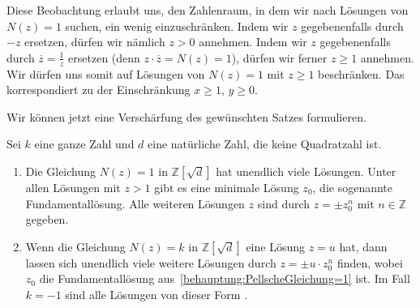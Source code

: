 Diese Beobachtung erlaubt uns, den Zahlenraum, in dem wir nach Lösungen von $N(z)=1$ suchen, ein wenig einzuschränken. Indem wir $z$ gegebenenfalls durch $-z$ ersetzen, dürfen wir nämlich $z>0$ annehmen. Indem wir $z$ gegebenenfalls durch $\overline{z}=\frac 1z$ ersetzen (denn $z\cdot \overline{z}=N(z)=1$), dürfen wir ferner $z\geqslant 1$ annehmen. Wir dürfen uns somit auf Lösungen von $N(z)=1$ mit $z\geqslant 1$ beschränken. Das korrespondiert zu der Einschränkung $x\geqslant 1$, $y\geqslant 0$.

Wir können jetzt eine Verschärfung des gewünschten Satzes formulieren.
\begin{satzmitnamen}
	Sei $k$ eine ganze Zahl und $d$ eine natürliche Zahl, die keine Quadratzahl ist.
	\begin{enumerate}
		\item Die Gleichung $N(z)=1$ in $\mathbb Z[\sqrt{d}]$ hat unendlich viele Lösungen. Unter allen Lösungen mit $z>1$ gibt es eine minimale Lösung $z_0$, die sogenannte Fundamentallösung. Alle weiteren Lösungen $z$ sind durch $z=\pm z_0^n$ mit $n\in\mathbb Z$ gegeben.\label{behauptung:PellscheGleichung=1}
		\item Wenn die Gleichung $N(z)=k$ in $\mathbb Z[\sqrt{d}]$ eine Lösung $z=u$ hat, dann lassen sich unendlich viele weitere Lösungen durch $z=\pm u\cdot z_0^n$ finden, wobei~$z_0$ die Fundamentallösung aus~\ref{behauptung:PellscheGleichung=1} ist. Im Fall $k=-1$ sind alle Lösungen von dieser Form .\label{behauptung:PellscheGleichung=k}
	\end{enumerate}
\end{satzmitnamen}

